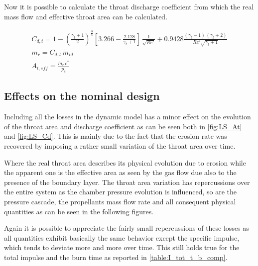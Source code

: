\begin{itemize}
    Now it is possible to calculate the throat discharge coefficient from which the real mass flow and effective throat area can be calculated.  

    \begin{gather}
        C_{d,t} = 1 - \left( \frac{\gamma_t+1}{2} \right)^{\frac{3}{4}}
        \left[3.266 - \frac{2.128}{\gamma_t+1} \right] \, \frac{1}{\sqrt{Re'}} + 0.9428 \frac{(\gamma_t - 1) \, (\gamma_t + 2)}{Re' \sqrt{\gamma_t + 1}} \\
        \dot{m}_r = C_{d,t} \, \dot{m}_{id} \\
        A_{t,eff} = \frac{\dot{m}_r \, c^*}{p_c}
    \end{gather}
\end{itemize}

\subsection{Effects on the nominal design}  

Including all the losses in the dynamic model has a minor effect on the evolution of the throat area and discharge coefficient as can be seen both in \autoref{fig:LS_At} and \autoref{fig:LS_Cd}. This is mainly due to the fact that the erosion rate was recovered by imposing a rather small variation of the throat area over time. 


Where the real throat area describes its physical evolution due to erosion while the apparent one is the effective area as seen by the gas flow due also to the presence of the boundary layer. The throat area variation has repercussions over the entire system as the chamber pressure evolution is influenced, so are the pressure cascade, the propellants mass flow rate and all consequent physical quantities as can be seen in the following figures.  


Again it is possible to appreciate the fairly small repercussions of these losses as all quantities exhibit basically the same behavior except the specific impulse, which tends to deviate more and more over time. This still holds true for the total impulse and the burn time as reported in \autoref{table:I_tot_t_b_comp}.

